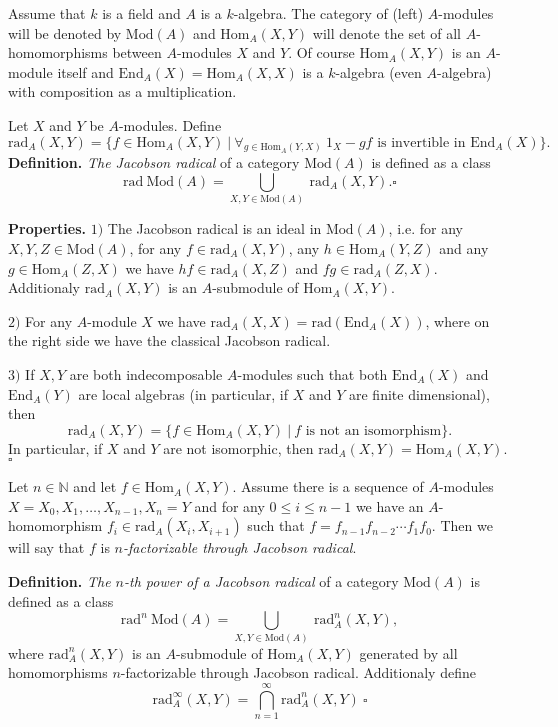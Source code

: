 \documentclass[12pt]{article}
\begin{document}
Assume that $k$ is a field and $A$ is a $k$-algebra. The category of (left) $A$-modules will be denoted by $\mathrm{Mod}(A)$ and $\mathrm{Hom}_{A}(X,Y)$ will denote the set of all $A$-homomorphisms between $A$-modules $X$ and $Y$. Of course $\mathrm{Hom}_{A}(X,Y)$ is an $A$-module itself and $\mathrm{End}_{A}(X)=\mathrm{Hom}_{A}(X,X)$ is a $k$-algebra (even $A$-algebra) with composition as a multiplication.

Let $X$ and $Y$ be $A$-modules. Define
$$\mathrm{rad}_{A}(X,Y)=\{f\in\mathrm{Hom}_{A}(X,Y)\ |\ \forall_{g\in\mathrm{Hom}_{A}(Y,X)}\ 1_{X}-gf \mbox{ is invertible in }\mathrm{End}_{A}(X)\}.$$
\textbf{Definition.} \textit{The Jacobson radical} of a category $\mathrm{Mod}(A)$ is defined as a class
$$\mathrm{rad}\ \mathrm{Mod}(A)=\bigcup_{X,Y\in\mathrm{Mod}(A)}\ \mathrm{rad}_{A}(X,Y). \square$$

\textbf{Properties.} $1)$ The Jacobson radical is an ideal in $\mathrm{Mod}(A)$, i.e. for any $X,Y,Z\in\mathrm{Mod}(A)$, for any $f\in\mathrm{rad}_{A}(X,Y)$, any $h\in\mathrm{Hom}_{A}(Y,Z)$ and any $g\in\mathrm{Hom}_{A}(Z,X)$ we have $hf\in\mathrm{rad}_{A}(X,Z)$ and $fg\in\mathrm{rad}_{A}(Z,X)$. Additionaly $\mathrm{rad}_{A}(X,Y)$ is an $A$-submodule of $\mathrm{Hom}_{A}(X,Y)$.

$2)$ For any $A$-module $X$ we have $\mathrm{rad}_{A}(X,X)=\mathrm{rad}(\mathrm{End}_{A}(X))$, where on the right side we have the classical Jacobson radical.

$3)$ If $X,Y$ are both indecomposable $A$-modules such that both $\mathrm{End}_{A}(X)$ and $\mathrm{End}_{A}(Y)$ are local algebras (in particular, if $X$ and $Y$ are finite dimensional), then 
$$\mathrm{rad}_{A}(X,Y)=\{f\in\mathrm{Hom}_{A}(X,Y)\ |\ f\mbox{ is not an isomorphism}\}.$$
In particular, if $X$ and $Y$ are not isomorphic, then $\mathrm{rad}_{A}(X,Y)=\mathrm{Hom}_{A}(X,Y)$. $\square$

Let $n\in\mathbb{N}$ and let $f\in\mathrm{Hom}_{A}(X,Y)$. Assume there is a sequence of $A$-modules $X=X_0,X_1,\ldots,X_{n-1},X_n=Y$ and for any $0\leq i\leq n-1$ we have an $A$-homomorphism $f_i\in\mathrm{rad}_{A}(X_i,X_{i+1})$ such that $f=f_{n-1}f_{n-2}\cdots f_{1}f_{0}$. Then we will say that $f$ is \textit{$n$-factorizable through Jacobson radical}.

\textbf{Definition.} \textit{The $n$-th power of a Jacobson radical} of a category $\mathrm{Mod}(A)$ is defined as a class
$$\mathrm{rad}^{n}\ \mathrm{Mod}(A)=\bigcup_{X,Y\in\mathrm{Mod}(A)}\ \mathrm{rad}^{n}_{A}(X,Y),$$
where $\mathrm{rad}^{n}_{A}(X,Y)$ is an $A$-submodule of $\mathrm{Hom}_{A}(X,Y)$ generated by all homomorphisms $n$-factorizable through Jacobson radical. Additionaly define 
$$\mathrm{rad}^{\infty}_{A}(X,Y)=\bigcap_{n=1}^{\infty}\mathrm{rad}^{n}_{A}(X,Y)\ \square$$
\end{document}
